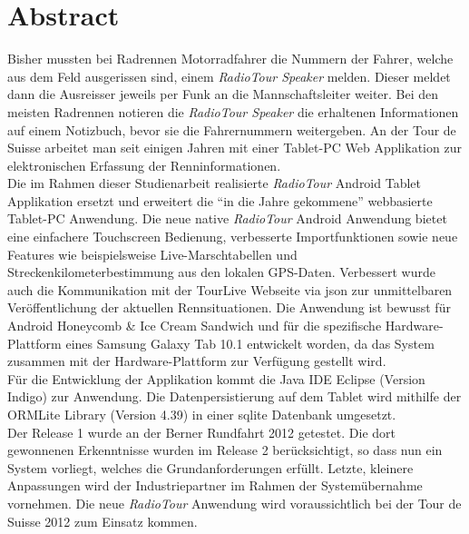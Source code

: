 \chapter*{Abstract}

Bisher mussten bei Radrennen Motorradfahrer die Nummern der Fahrer, welche aus dem Feld ausgerissen sind, einem \textit{RadioTour Speaker} melden. Dieser meldet dann die Ausreisser jeweils per Funk an die Mannschaftsleiter weiter. Bei den meisten Radrennen notieren die \textit{RadioTour Speaker} die erhaltenen Informationen auf einem Notizbuch, bevor sie die Fahrernummern weitergeben. An der Tour de Suisse arbeitet man seit einigen Jahren mit einer Tablet-PC Web Applikation zur elektronischen Erfassung der Renninformationen.
\\
Die im Rahmen dieser Studienarbeit realisierte \textit{RadioTour} Android Tablet Applikation ersetzt und erweitert die "`in die Jahre gekommene"' webbasierte Tablet-PC Anwendung. Die neue native \textit{RadioTour} Android Anwendung bietet eine einfachere Touchscreen Bedienung, verbesserte Importfunktionen sowie neue Features wie beispielsweise Live-Marschtabellen und Streckenkilometerbestimmung aus den lokalen GPS-Daten. Verbessert wurde auch die Kommunikation mit der TourLive Webseite via \gls{json} zur unmittelbaren Veröffentlichung der aktuellen Rennsituationen. Die Anwendung ist bewusst für Android Honeycomb \& Ice Cream Sandwich und für die  spezifische Hardware-Plattform eines Samsung Galaxy Tab 10.1 entwickelt worden, da das System zusammen mit der Hardware-Plattform zur Verfügung gestellt wird.
\\
Für die Entwicklung der Applikation kommt die Java IDE Eclipse (Version Indigo) zur Anwendung. Die Datenpersistierung auf dem Tablet wird mithilfe der ORMLite Library (Version 4.39) in einer \gls{sqlite} Datenbank umgesetzt.
\\
Der Release 1 wurde an der Berner Rundfahrt 2012 getestet. Die dort gewonnenen Erkenntnisse wurden im Release 2 berücksichtigt, so dass nun ein System vorliegt, welches die Grundanforderungen erfüllt. Letzte, kleinere Anpassungen wird der Industriepartner im Rahmen der Systemübernahme vornehmen. Die neue \textit{RadioTour} Anwendung wird voraussichtlich bei der Tour de Suisse 2012 zum Einsatz kommen.
